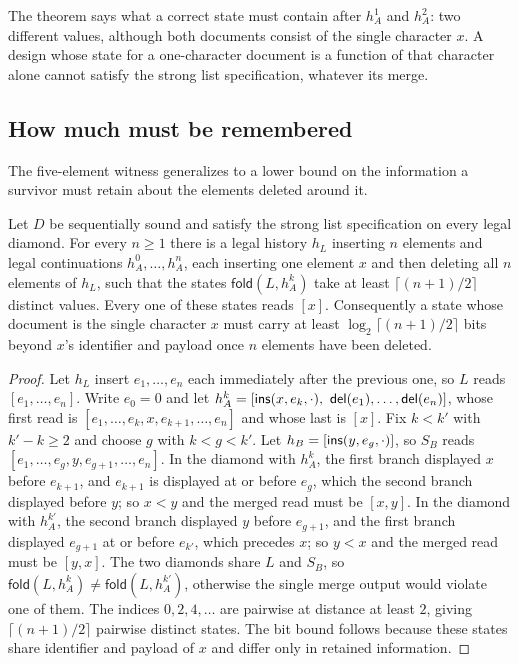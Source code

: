 The theorem says what a correct state must contain after
$h^1_A$ and $h^2_A$: two different values, although both documents consist
of the single character $x$. A design whose state for a one-character
document is a function of that character alone cannot satisfy the strong
list specification, whatever its merge.

\subsection{How much must be remembered}

The five-element witness generalizes to a lower bound on the information a
survivor must retain about the elements deleted around it.

\begin{theorem}
\label{thm:lower}
Let $D$ be sequentially sound and satisfy the strong list specification on
every legal diamond. For every $n\ge 1$ there is a legal history $h_L$ inserting $n$ elements and
legal continuations $h^0_A,\ldots,h^n_A$, each inserting one element $x$ and
then deleting all $n$ elements of $h_L$, such that the states
$\mathsf{fold}(L,h^k_A)$ take at least $\lceil (n+1)/2\rceil$ distinct
values. Every one of these states reads $[x]$. Consequently a state whose
document is the single character $x$ must carry at least
$\log_2\lceil (n+1)/2\rceil$ bits beyond $x$'s identifier and payload once
$n$ elements have been deleted.
\end{theorem}

\begin{proof}
Let $h_L$ insert $e_1,\ldots,e_n$ each immediately after the previous one,
so $L$ reads $[e_1,\ldots,e_n]$. Write $e_0=0$ and let
$h^k_A=[\ins(x,e_k,\cdot),\ \del(e_1),\ldots,\del(e_n)]$, whose first read
is $[e_1,\ldots,e_k,x,e_{k+1},\ldots,e_n]$ and whose last is $[x]$. Fix
$k<k'$ with $k'-k\ge 2$ and choose $g$ with $k<g<k'$. Let
$h_B=[\mathsf{ins}(y,e_g,\cdot)]$, so $S_B$ reads
$[e_1,\ldots,e_g,y,e_{g+1},\ldots,e_n]$. In the diamond with $h^k_A$, the
first branch displayed $x$ before $e_{k+1}$, and $e_{k+1}$ is displayed at
or before $e_g$, which the second branch displayed before $y$; so $x<y$ and
the merged read must be $[x,y]$. In the diamond with $h^{k'}_A$, the second
branch displayed $y$ before $e_{g+1}$, and the first branch displayed
$e_{g+1}$ at or before $e_{k'}$, which precedes $x$; so $y<x$ and the merged
read must be $[y,x]$. The two diamonds share $L$ and $S_B$, so
$\mathsf{fold}(L,h^k_A)\neq\mathsf{fold}(L,h^{k'}_A)$, otherwise the single
merge output would violate one of them. The indices $0,2,4,\ldots$ are
pairwise at distance at least $2$, giving $\lceil (n+1)/2\rceil$ pairwise
distinct states. The bit bound follows because these states share identifier
and payload of $x$ and differ only in retained information.
\end{proof}

